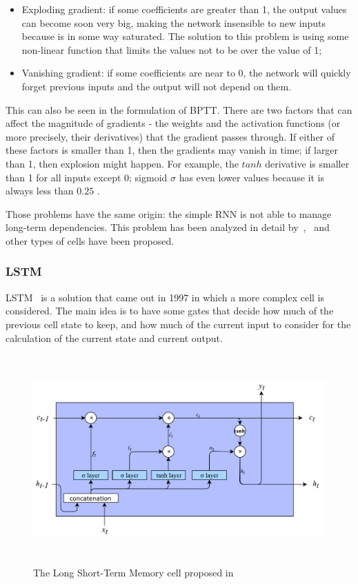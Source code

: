 \begin{itemize}
	\item Exploding gradient: if some coefficients are greater than 1, the output values can become soon very big, making the network insensible to new inputs because is in some way saturated. The solution to this problem is using some non-linear function that limits the values not to be over the value of 1;

	\item Vanishing gradient: if some coefficients are near to 0, the network will quickly forget previous inputs and the output will not depend on them.
\end{itemize}

This can also be seen in the formulation of BPTT. There are two factors that can affect the magnitude of gradients - the weights and the activation functions (or more precisely, their derivatives) that the gradient passes through. If either of these factors is smaller than 1, then the gradients may vanish in time; if larger than 1, then explosion might happen. For example, the  \( tanh \)  derivative is smaller than 1 for all inputs except 0; sigmoid  \(  \sigma  \)  has even lower values because it is always less than  \( 0.25 \) .

Those problems have the same origin: the simple RNN is not able to manage long-term dependencies. This problem has been analyzed in detail by~\cite{bengio1994learning},~\cite{hochreiter1998vanishing} and other types of cells have been proposed.

\subsubsection{LSTM}
LSTM~\cite{hochreiter1997long} is a solution that came out in 1997 in which a more complex cell is considered. The main idea is to have some gates that decide how much of the previous cell state to keep, and how much of the current input to consider for the calculation of the current state and current output.

\begin{figure}[!htbp]
    \centering
    \includegraphics[max width=\linewidth,max height=8cm,keepaspectratio]{figures/LSTM}
    \caption{The Long Short-Term Memory cell proposed in~\cite{hochreiter1997long}}\label{fig:LSTM}
\end{figure}

